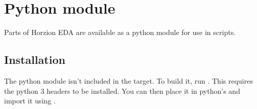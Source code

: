 \documentclass[letterpaper,10pt,czech]{sphinxmanual}
\begin{document}
\chapter{Python module}
\label{\detokenize{python:python-module}}\label{\detokenize{python::doc}}
Parts of Horzion EDA are available as a python module for use in scripts.


\section{Installation}
\label{\detokenize{python:installation}}
The python module isn’t included in the  target.  To build it, run . This requires the python 3 headers to be installed. You can then place it in python’s  and import it using .
\end{document}
